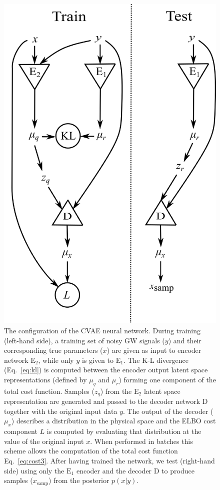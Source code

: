 \documentclass[%
showpacs,
 amsmath,amssymb,
 aps,
 twocolumn,
 prl,
 reprint,
floatfix,
]{revtex4-1}
\begin{document}
\begin{figure}
    \includegraphics[width=\columnwidth]{images/network_setup.png}
    \caption{\label{fig:network_config} The configuration of the \ac{CVAE}
neural network. During training (left-hand side), a training set of noisy
\ac{GW} signals ($y$) and their corresponding true parameters ($x$) are given
as input to encoder network $\textrm{E}_2$, while only $y$ is given to
$\textrm{E}_1$.  The K-L divergence (Eq.~\ref{eq:kl}) is computed between the
encoder output latent space representations (defined by $\mu_q$ and $\mu_r$)
forming one component of the total cost function.  Samples ($z_q$) from the
$\text{E}_{2}$ latent space representation are generated and passed to the
decoder network D together with the original input data $y$. The output of the
decoder ($\mu_x$) describes a distribution in the physical space and the
\ac{ELBO} cost component $L$ is computed by evaluating that distribution at the
value of the original input $x$. When performed in batches this scheme allows
the computation of the total cost function Eq.~\ref{eq:cost3}. After having
trained the network, we test (right-hand side) using only the $\textrm{E}_1$
encoder and the decoder D to produce samples ($x_{\text{samp}}$) from the
posterior $p(x|y)$.}
\end{figure}
\end{document}
